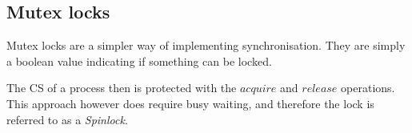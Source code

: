 \subsection{Mutex locks}

Mutex locks are a simpler way of implementing synchronisation. They are simply
a boolean value indicating if something can be locked.

The CS of a process then is protected with the $acquire$ and $release$ operations. This approach
however does require busy waiting, and therefore the lock is referred to as a \textit{Spinlock}.